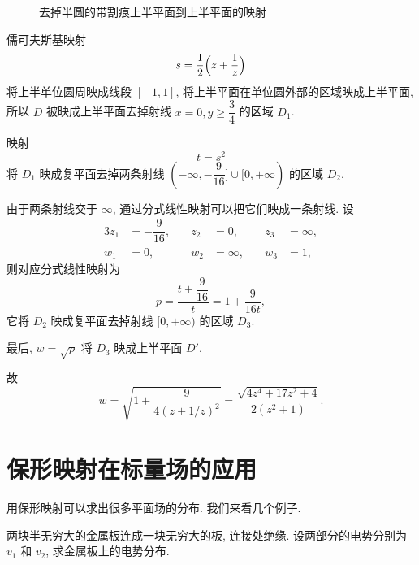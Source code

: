 \begin{figure}[!htb]
  \caption{去掉半圆的带割痕上半平面到上半平面的映射}
\end{figure}

\begin{solutionenum}
  \item 儒可夫斯基映射
  \[
    s=\frac12\Bigl(z+\frac1z\Bigr)
  \]
  将上半单位圆周映成线段 $[-1,1]$, 将上半平面在单位圆外部的区域映成上半平面, 所以 $D$ 被映成上半平面去掉射线 $x=0,y\ge \dfrac34$ 的区域 $D_1$.
  \item 映射
  \[
    t=s^2
  \]
  将 $D_1$ 映成复平面去掉两条射线 $(-\infty,-\dfrac9{16}]\cup[0,+\infty)$ 的区域 $D_2$.
  \item 由于两条射线交于 $\infty$, 通过分式线性映射可以把它们映成一条射线.
  设
  \begin{alignat*}{3}
    z_1&=-\dfrac9{16},\quad&
    z_2&=0,&
    z_3&=\infty,\\
    w_1&=0,&
    w_2&=\infty,\quad&
    w_3&=1,
  \end{alignat*}
  则对应分式线性映射为
  \[
    p=\frac{t+\dfrac9{16}}t=1+\frac9{16t},
  \]
  它将 $D_2$ 映成复平面去掉射线 $[0,+\infty)$ 的区域 $D_3$.
  \item 最后, $w=\sqrt p$ 将 $D_3$ 映成上半平面 $D'$.
  
  故
  \[
    w=\sqrt{1+\frac9{4(z+1/z)^2}}
    =\frac{\sqrt{4z^4+17z^2+4}}{2(z^2+1)}.
  \]
\end{solutionenum}


\section{保形映射在标量场的应用}

用保形映射可以求出很多平面场的分布.
我们来看几个例子.

\begin{example}
  两块半无穷大的金属板连成一块无穷大的板, 连接处绝缘.
  设两部分的电势分别为 $v_1$ 和 $v_2$, 求金属板上的电势分布.
\end{example}

